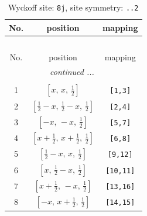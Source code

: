 \documentclass[fleqn,8pt]{jsarticle}
\begin{document}
\begin{longtable}{ccc}
\caption{Wyckoff site: {\tt 8j}, site symmetry: {\tt ..2}}
 \\
 \hline \hline
No. & position & mapping \\ \hline \endfirsthead

\multicolumn{2}{l}{\tablename\ \thetable{}} \\
 \hline \hline
No. & position & mapping \\ \hline \endhead

 \hline \hline
\multicolumn{2}{r}{\footnotesize\it continued ...} \\ \endfoot

 \hline \hline
\multicolumn{2}{r}{} \\ \endlastfoot

1 & $\left[ x,\, x,\, \frac{1}{2} \right]$ & {\tt [1,3]} \\ \hline
2 & $\left[ \frac{1}{2} - x,\, \frac{1}{2} - x,\, \frac{1}{2} \right]$ & {\tt [2,4]} \\ \hline
3 & $\left[ - x,\, - x,\, \frac{1}{2} \right]$ & {\tt [5,7]} \\ \hline
4 & $\left[ x + \frac{1}{2},\, x + \frac{1}{2},\, \frac{1}{2} \right]$ & {\tt [6,8]} \\ \hline
5 & $\left[ \frac{1}{2} - x,\, x,\, \frac{1}{2} \right]$ & {\tt [9,12]} \\ \hline
6 & $\left[ x,\, \frac{1}{2} - x,\, \frac{1}{2} \right]$ & {\tt [10,11]} \\ \hline
7 & $\left[ x + \frac{1}{2},\, - x,\, \frac{1}{2} \right]$ & {\tt [13,16]} \\ \hline
8 & $\left[ - x,\, x + \frac{1}{2},\, \frac{1}{2} \right]$ & {\tt [14,15]} \\
\end{longtable}
\renewcommand{\arraystretch}{1.2}
\end{document}
